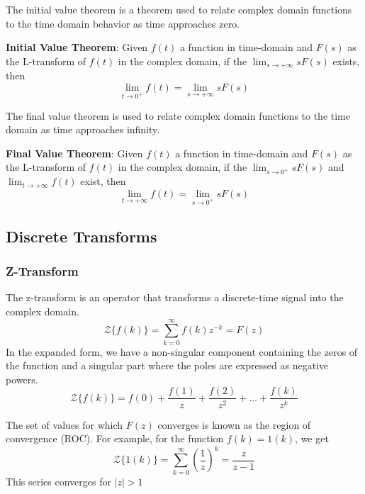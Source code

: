 \documentclass[11pt]{article}
\begin{document}
The initial value theorem is a theorem used to relate complex domain functions to the time domain behavior as time approaches zero.

\textbf{Initial Value Theorem}: 
Given $f(t)$ a function in time-domain and $F(s)$ as the L-transform of $f(t)$ in the complex domain, if the $\lim_{s \to + \infty} sF(s)$ exists, then
\begin{equation}
  \lim_{t\to 0^+} f(t) = \lim_{s \to + \infty} sF(s)
\end{equation}

The final value theorem is used to relate complex domain functions to the time domain as time approaches infinity.

\textbf{Final Value Theorem}:
Given $f(t)$ a function in time-domain and $F(s)$ as the L-transform of $f(t)$ in the complex domain, if the $\lim_{s \to 0^+} sF(s)$ and $\lim_{t \to + \infty} f(t)$ exist, then
\begin{equation}
  \lim_{t\to + \infty} f(t) = \lim_{s \to 0^+} sF(s)
\end{equation}

\subsection{Discrete Transforms}
\subsubsection{Z-Transform}
The z-transform is an operator that transforms a discrete-time signal into the complex domain.
\begin{equation}
  \mathcal{Z}\{ f(k) \} = \sum_{k=0}^{\infty} f(k) z^{-k} = F(z)
\end{equation}
In the expanded form, we have a non-singular component containing the zeros of the function and a singular part where the poles are expressed as negative powers.
\begin{equation}
  \mathcal{Z}\{ f(k) \} = f(0) + \frac{f(1)}{z} + \frac{f(2)}{z^2} + \dots + \frac{f(k)}{z^k}
\end{equation}

The set of values for which $F(z)$ converges is known as the region of convergence (ROC).
For example, for the function $f(k) = 1(k)$, we get 
\begin{equation}
  \mathcal{Z}\{ 1(k) \} = \sum_{k=0}^{\infty} (\frac{1}{z})^k =  \frac{z}{z-1}
\end{equation}
This series converges for $|z|>1$
\end{document}
